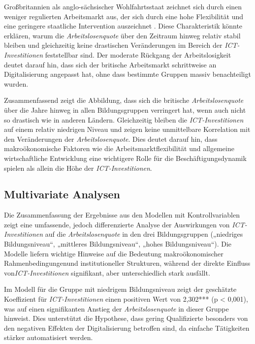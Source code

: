 Großbritannien als anglo-sächsischer Wohlfahrtsstaat zeichnet sich durch einen weniger 
regulierten Arbeitsmarkt aus, der sich durch eine hohe Flexibilität und eine geringere staatliche 
Intervention auszeichnet \parencite[vgl.][S. 21]{trabert1997entwicklung}. Diese Charakteristik 
könnte erklären, warum die \textit{Arbeitslosenquote} über den Zeitraum hinweg relativ stabil 
bleiben und gleichzeitig keine drastischen Veränderungen im Bereich der 
\textit{\ac{ICT}-Investitionen} feststellbar sind. Der moderate Rückgang der Arbeitslosigkeit 
deutet darauf hin, dass sich der britische Arbeitsmarkt schrittweise an Digitalisierung angepasst 
hat, ohne dass bestimmte Gruppen massiv benachteiligt wurden.

Zusammenfassend zeigt die Abbildung, dass sich die britische \textit{Arbeitslosenquote} über die 
Jahre hinweg in allen Bildungsgruppen verringert hat, wenn auch nicht so drastisch wie in anderen 
Ländern. Gleichzeitig bleiben die \textit{\ac{ICT}-Investitionen} auf einem relativ niedrigen 
Niveau und zeigen keine unmittelbare Korrelation mit den Veränderungen der 
\textit{Arbeitslosenquote}. Dies deutet darauf hin, dass makroökonomische Faktoren wie die 
Arbeitsmarktflexibilität und allgemeine wirtschaftliche Entwicklung eine wichtigere Rolle für die 
Beschäftigungsdynamik spielen als allein die Höhe der \textit{\ac{ICT}-Investitionen}.


\subsection{Multivariate Analysen}

Die Zusammenfassung der Ergebnisse aus den Modellen mit Kontrollvariablen zeigt eine umfassende, 
jedoch differenzierte Analyse der Auswirkungen von \textit{\ac{ICT}-Investitionen} auf die 
\textit{Arbeitslosenquote} in den drei Bildungsgruppen („niedriges Bildungsniveau“, „mittleres 
Bildungsniveau“, „hohes Bildungsniveau“). Die Modelle liefern wichtige Hinweise auf die Bedeutung 
makroökonomischer Rahmenbedingungenund institutioneller Strukturen, während der direkte Einfluss 
von\textit{\ac{ICT}-Investitionen} signifikant, aber unterschiedlich stark ausfällt.



Im Modell für die Gruppe mit niedrigem Bildungsniveau zeigt der geschätzte Koeffizient für 
\textit{\ac{ICT}-Investitionen} einen positiven Wert von 2,302*** (p < 0,001), was auf einen 
signifikanten Anstieg der \textit{Arbeitslosenquote} in dieser Gruppe hinweist. Dies unterstützt 
die Hypothese, dass gering Qualifizierte besonders von den negativen Effekten der Digitalisierung 
betroffen sind, da einfache Tätigkeiten stärker automatisiert werden.

